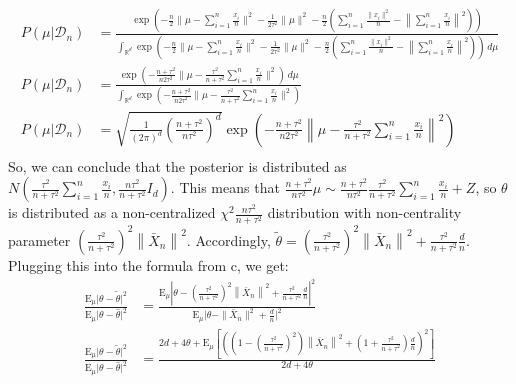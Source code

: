 \documentclass[11pt]{article}
\newcommand{\R}{\mathbb{R}}
\newcommand{\E}{\mathrm{E}}
\theoremstyle{definition}
\begin{document}
\begin{itemize}
\begin{itemize}
\begin{align*}
                    P(\mu \vert \mathcal{D}_n) &= \frac{ \exp\left(-\frac{n}{2}\|\mu-\sum_{i=1}^n\frac{x_i}{n}\|^2 -\frac{1}{2\tau^2}\|\mu\|^2 -\frac{n}{2}\left(\sum_{i=1}^n\frac{\|x_i\|^2}{n}-\left\|\sum_{i=1}^n\frac{x_i}{n}\right\|^2\right)\right)}{\int_{\R^d}\exp\left(-\frac{n}{2}\|\mu-\sum_{i=1}^n\frac{x_i}{n}\|^2-\frac{1}{2\tau^2}\|\mu\|^2 -\frac{n}{2}\left(\sum_{i=1}^n\frac{\|x_i\|^2}{n}-\left\|\sum_{i=1}^n\frac{x_i}{n}\right\|^2\right)\right) \, d\mu}  \\
                    P(\mu \vert \mathcal{D}_n) &= \frac{ \exp\left(-\frac{n+\tau^2}{n2\tau^2}\|\mu-\frac{\tau^2}{n+\tau^2}\sum_{i=1}^n\frac{x_i}{n}\|^2\right)  \, d\mu}{\int_{\R^d}\exp\left(-\frac{n+\tau^2}{n2\tau^2}\|\mu-\frac{\tau^2}{n+\tau^2}\sum_{i=1}^n\frac{x_i}{n}\|^2\right)}  \\
                    P(\mu \vert \mathcal{D}_n) &= \sqrt{\frac{1}{(2\pi)^d}\left(\frac{n+\tau^2}{n\tau^2}\right)^d} \exp\left(-\frac{n+\tau^2}{n2\tau^2}\left\|\mu-\frac{\tau^2}{n+\tau^2}\sum_{i=1}^n\frac{x_i}{n}\right\|^2\right) \\
                \end{align*}
                So, we can conclude that the posterior is distributed as \(N\left(\frac{\tau^2}{n+\tau^2}\sum_{i=1}^n\frac{x_i}{n},\frac{n\tau^2}{n+\tau^2}I_d\right)\). This means that \(\frac{n+\tau^2}{n\tau^2}\mu \sim \frac{n+\tau^2}{n\tau^2}\frac{\tau^2}{n+\tau^2}\sum_{i=1}^n\frac{x_i}{n} + Z\), so $\theta$ is distributed as a non-centralized \(\chi^2\frac{n\tau^2}{n+\tau^2}\) distribution with non-centrality parameter \(\left(\frac{\tau^2}{n+\tau^2}\right)^2\left\|\bar X_n\right\|^2\). Accordingly, \(\tilde \theta = \left(\frac{\tau^2}{n+\tau^2}\right)^2\left\|\bar X_n\right\|^2+\frac{\tau^2}{n+\tau^2}\frac{d}{n}\). Plugging this into the formula from c, we get:
                \begin{align*}
                    \frac{\E_\mu\vert \theta - \tilde \theta\vert^2}{\E_\mu\vert \theta - \hat \theta\vert^2} &= \frac{\E_\mu\left\vert \theta - \left(\frac{\tau^2}{n+\tau^2}\right)^2\left\|\bar X_n\right\|^2+\frac{\tau^2}{n+\tau^2}\frac{d}{n}\right\vert^2}{\E_\mu\vert \theta - \|\bar X_n\|^2 + \frac{d}{n}\vert^2}  \\
                    \frac{\E_\mu\vert \theta - \tilde \theta\vert^2}{\E_\mu\vert \theta - \hat \theta\vert^2} &= \frac{2d+4\theta + \E_\mu\left[\left(\left(1- \left(\frac{\tau^2}{n+\tau^2}\right)^2\right)\left\|\bar X_n\right\|^2+\left(1+\frac{\tau^2}{n+\tau^2}\right)\frac{d}{n}\right)^2\right]}{2d+4\theta}  \\

\end{align*}
\end{itemize}
\end{itemize}
\end{document}
